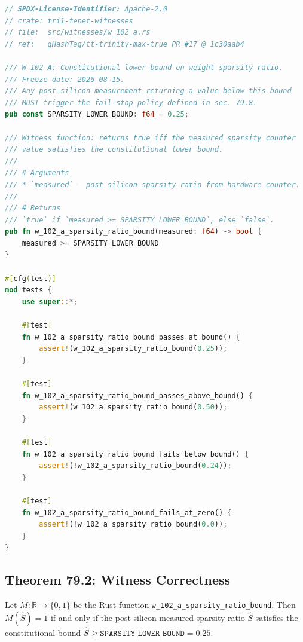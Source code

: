 \begin{lstlisting}[language=Rust, caption={Public interface of crate
  \texttt{tri1-tenet-witnesses} (PR \#17 @ \texttt{1c30aab4})},
  label={lst:witness-w102a}]
// SPDX-License-Identifier: Apache-2.0
// crate: tri1-tenet-witnesses
// file:  src/witnesses/w_102_a.rs
// ref:   gHashTag/tt-trinity-max-true PR #17 @ 1c30aab4

/// W-102-A: Constitutional lower bound on weight sparsity ratio.
/// Freeze date: 2026-08-15.
/// Any post-silicon measurement returning a value below this bound
/// MUST trigger the fail-stop policy defined in sec. 79.8.
pub const SPARSITY_LOWER_BOUND: f64 = 0.25;

/// Witness function: returns true iff the measured sparsity counter
/// value satisfies the constitutional lower bound.
///
/// # Arguments
/// * `measured` - post-silicon sparsity ratio from hardware counter.
///
/// # Returns
/// `true` if `measured >= SPARSITY_LOWER_BOUND`, else `false`.
pub fn w_102_a_sparsity_ratio_bound(measured: f64) -> bool {
    measured >= SPARSITY_LOWER_BOUND
}

#[cfg(test)]
mod tests {
    use super::*;

    #[test]
    fn w_102_a_sparsity_ratio_bound_passes_at_bound() {
        assert!(w_102_a_sparsity_ratio_bound(0.25));
    }

    #[test]
    fn w_102_a_sparsity_ratio_bound_passes_above_bound() {
        assert!(w_102_a_sparsity_ratio_bound(0.50));
    }

    #[test]
    fn w_102_a_sparsity_ratio_bound_fails_below_bound() {
        assert!(!w_102_a_sparsity_ratio_bound(0.24));
    }

    #[test]
    fn w_102_a_sparsity_ratio_bound_fails_at_zero() {
        assert!(!w_102_a_sparsity_ratio_bound(0.0));
    }
}
\end{lstlisting}

\subsection{Theorem 79.2: Witness Correctness}
\label{subsec:ch79-theorem-witness}

\begin{theorem}
\label{thm:witness-correctness}
Let $M : \mathbb{R} \to \{0, 1\}$ be the Rust function
\texttt{w\_102\_a\_sparsity\_ratio\_bound}.
Then $M(\hat{S}) = 1$ if and only if the post-silicon measured
sparsity ratio $\hat{S}$ satisfies the constitutional bound
$\hat{S} \geq \texttt{SPARSITY\_LOWER\_BOUND} = 0.25$.
\end{theorem}


